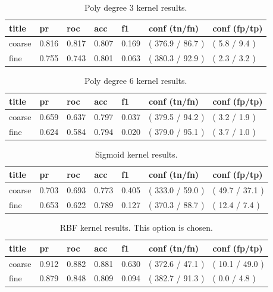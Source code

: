 \documentclass[ms]{nuthesis}
\begin{document}
\FloatBarrier
\begin{table}[H]
\centering
\caption{Poly degree 3 kernel results.}
\label{tab:polyDeg3}
\begin{tabular}{|l||l||l||l||l||l||l|}\toprule
title & pr & roc & acc & f1 & conf (tn/fn) & conf (fp/tp) \\ \midrule
coarse & 0.816 & 0.817 & 0.807 & 0.169 & ( 376.9 / 86.7 ) & ( 5.8 / 9.4 ) \\
fine & 0.755 & 0.743 & 0.801 & 0.063 & ( 380.3 / 92.9 ) & ( 2.3 / 3.2 ) \\ \bottomrule
\end{tabular}
\end{table}
\FloatBarrier

\FloatBarrier
\begin{table}[H]
\centering
\caption{Poly degree 6 kernel results.}
\label{tab:polyDeg6}
\begin{tabular}{|l||l||l||l||l||l||l|}\toprule
title & pr & roc & acc & f1 & conf (tn/fn) & conf (fp/tp) \\ \midrule
coarse & 0.659 & 0.637 & 0.797 & 0.037 & ( 379.5 / 94.2 ) & ( 3.2 / 1.9 ) \\
fine & 0.624 & 0.584 & 0.794 & 0.020 & ( 379.0 / 95.1 ) & ( 3.7 / 1.0 ) \\ \bottomrule
\end{tabular}
\end{table}
\FloatBarrier

\FloatBarrier
\begin{table}[H]
\centering
\caption{Sigmoid kernel results.}
\label{tab:sigmoid}
\begin{tabular}{|l||l||l||l||l||l||l|}\toprule
title & pr & roc & acc & f1 & conf (tn/fn) & conf (fp/tp) \\ \midrule
coarse & 0.703 & 0.693 & 0.773 & 0.405 & ( 333.0 / 59.0 ) & ( 49.7 / 37.1 ) \\
fine & 0.653 & 0.622 & 0.789 & 0.127 & ( 370.3 / 88.7 ) & ( 12.4 / 7.4 ) \\ \bottomrule
\end{tabular}
\end{table}
\FloatBarrier

\FloatBarrier
\begin{table}[H]
\centering
\caption{RBF kernel results. This option is chosen.}
\label{tab:RbfOrig}
\begin{tabular}{|l||l||l||l||l||l||l|}\toprule
title & pr & roc & acc & f1 & conf (tn/fn) & conf (fp/tp) \\ \midrule
coarse & 0.912 & 0.882 & 0.881 & 0.630 & ( 372.6 / 47.1 ) & ( 10.1 / 49.0 ) \\
fine & 0.879 & 0.848 & 0.809 & 0.094 & ( 382.7 / 91.3 ) & ( 0.0 / 4.8 ) \\ \bottomrule
\end{tabular}
\end{table}
\FloatBarrier
\end{document}
